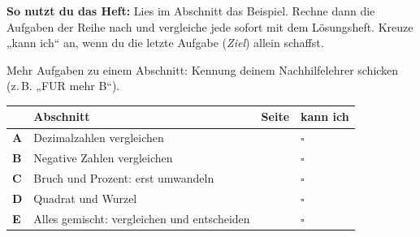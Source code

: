 \documentclass[11pt]{article}
\begin{document}
\par\smallskip
{}\par\medskip
\noindent\textbf{So nutzt du das Heft:} Lies im Abschnitt das Beispiel. Rechne dann die Aufgaben der Reihe nach und vergleiche jede sofort mit dem Lösungsheft. Kreuze „kann ich“ an, wenn du die letzte Aufgabe (\emph{Ziel}) allein schaffst.\par
\noindent Mehr Aufgaben zu einem Abschnitt: Kennung deinem Nachhilfelehrer schicken (z.\,B. „FUR mehr B“).\par\medskip
{\renewcommand{\arraystretch}{1.3}
\noindent\begin{tabular}{|>{\bfseries}p{10mm}|p{112mm}|>{\raggedleft\arraybackslash}p{10mm}|>{\centering\arraybackslash}p{14mm}|}\hline
\rowcolor{black!8} & \textbf{Abschnitt} & \textbf{Seite} & \textbf{kann ich}\\\hline
A & Dezimalzahlen vergleichen & \pageref{s:A} & $\square$\\\hline
B & Negative Zahlen vergleichen & \pageref{s:B} & $\square$\\\hline
C & Bruch und Prozent: erst umwandeln & \pageref{s:C} & $\square$\\\hline
D & Quadrat und Wurzel & \pageref{s:D} & $\square$\\\hline
E & Alles gemischt: vergleichen und entscheiden & \pageref{s:E} & $\square$\\\hline
\end{tabular}}\par\bigskip
\end{document}
